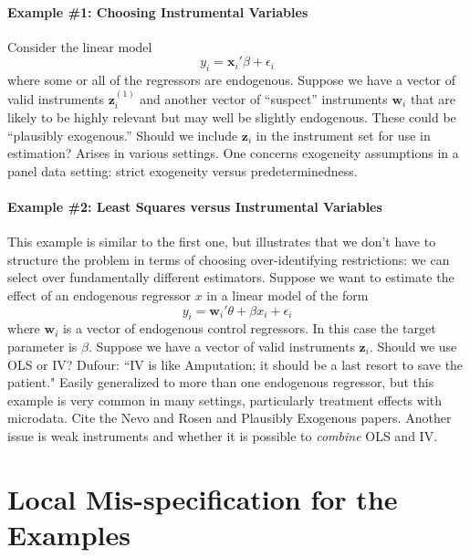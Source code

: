 \documentclass[12pt]{article}\usepackage[]{graphicx}\usepackage[]{color}
\theoremstyle{definition}
\begin{document}
\paragraph{Example \#1: Choosing Instrumental Variables}
Consider the linear model
  \begin{equation}
  y_i = \mathbf{x}_i'\beta + \epsilon_i
  \end{equation}
where some or all of the regressors are endogenous. Suppose we have a vector of valid instruments $\mathbf{z}^{(1)}_i$ and another vector of ``suspect'' instruments $\mathbf{w}_i$ that are likely to be highly relevant but may well be slightly endogenous. These could be ``plausibly exogenous.'' Should we include $\mathbf{z}_i$ in the instrument set for use in estimation?  Arises in various settings. One concerns exogeneity assumptions in a panel data setting: strict exogeneity versus predeterminedness. 

\paragraph{Example \#2: Least Squares versus Instrumental Variables}
This example is similar to the first one, but illustrates that we don't have to structure the problem in terms of choosing over-identifying restrictions: we can select over fundamentally different estimators. Suppose we want to estimate the effect of an endogenous regressor $x$ in a linear model of the form
  \begin{equation}
    y_i = \mathbf{w}_i' \theta + \beta x_i + \epsilon_i
  \end{equation}
where $\mathbf{w}_i$ is a vector of endogenous control regressors. In this case the target parameter is $\beta$. Suppose we have a vector of valid instruments $\mathbf{z}_i$. Should we use OLS or IV? Dufour: ``IV is like Amputation; it should be a last resort to save the patient." Easily generalized to more than one endogenous regressor, but this example is very common in many settings, particularly treatment effects with microdata. Cite the Nevo and Rosen and Plausibly Exogenous papers. Another issue is weak instruments and whether it is possible to \emph{combine} OLS and IV.



\section{Local Mis-specification for the Examples}
\end{document}
